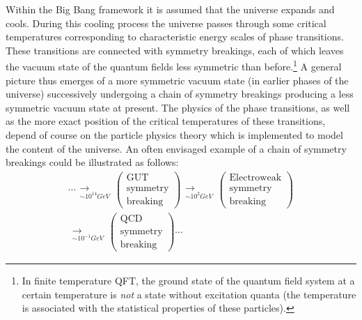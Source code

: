 \documentclass[12pt]{article}
\begin{document}
Within the Big Bang framework it is assumed that the universe
expands and cools. During this cooling process the universe passes
through some critical temperatures corresponding to characteristic
energy scales of phase transitions. These transitions are
connected with symmetry breakings, each of which leaves the vacuum
state of the quantum fields less symmetric than 
before.\footnote{In finite temperature QFT, the ground state of the
quantum field system at a certain temperature is {\em not} a state without
excitation quanta (the temperature is associated with
the statistical properties of these particles).} A general picture thus
emerges of a more symmetric vacuum state (in earlier phases of the
universe) successively undergoing a chain of symmetry breakings
producing a less symmetric vacuum state at present. The physics of
the phase transitions, as well as the more exact position of the
critical temperatures of these transitions, depend of course on
the particle physics theory which is implemented to model the
content of the universe. An often envisaged example of a chain of
symmetry breakings could be illustrated as follows: 
\begin{multline}
 \cdots
\begin{array}{c} \\ \longrightarrow\\ _{\sim 10^{14} GeV}
\end{array} \left( \begin{array}{c} \mbox{GUT} \\
\mbox{symmetry}\\ \mbox{breaking} \end{array} \right)
\begin{array}{c} \\ \longrightarrow\\ _{\sim 10^{2} GeV}
\end{array} \left( \begin{array}{c} \mbox{Electroweak} \\
\mbox{symmetry}\\ \mbox{breaking} \end{array} \right)
\\
\begin{array}{c} \\ \longrightarrow\\ _{\sim 10^{-1} GeV}
\end{array} \left( \begin{array}{c} \mbox{QCD} \\ \mbox{symmetry}
\\ \mbox{breaking} \end{array} \right) \cdots 
\end{multline}
\end{document}
